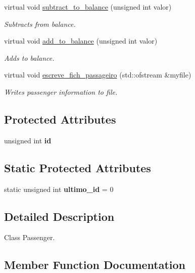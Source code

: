 \begin{DoxyCompactItemize}
virtual void \hyperlink{class_passageiro_a922b6669669a6e2af2328606013a3a6b}{subtract\+\_\+to\+\_\+balance} (unsigned int valor)
\begin{DoxyCompactList}\small\item\em Subtracts from balance. \end{DoxyCompactList}\item 
virtual void \hyperlink{class_passageiro_ac7da59960d323e9bc75dda2e34d7a254}{add\+\_\+to\+\_\+balance} (unsigned int valor)
\begin{DoxyCompactList}\small\item\em Adds to balance. \end{DoxyCompactList}\item 
virtual void \hyperlink{class_passageiro_aa38cf36a9d750417fc0b83781886a852}{escreve\+\_\+fich\+\_\+passageiro} (std\+::ofstream \&myfile)
\begin{DoxyCompactList}\small\item\em Writes passenger information to file. \end{DoxyCompactList}\end{DoxyCompactItemize}
\subsection*{Protected Attributes}
\begin{DoxyCompactItemize}
\item 
\mbox{\label{class_passageiro_aa8e0c8d33b61d163a91f8bd60a0ce69c}} 
unsigned int {\bfseries id}
\end{DoxyCompactItemize}
\subsection*{Static Protected Attributes}
\begin{DoxyCompactItemize}
\item 
\mbox{\label{class_passageiro_a722b13c9d8812b05345934e4c8fc58a5}} 
static unsigned int {\bfseries ultimo\+\_\+id} = 0
\end{DoxyCompactItemize}


\subsection{Detailed Description}
Class Passenger. 

\subsection{Member Function Documentation}
\mbox{\label{class_passageiro_ac7da59960d323e9bc75dda2e34d7a254}} 
